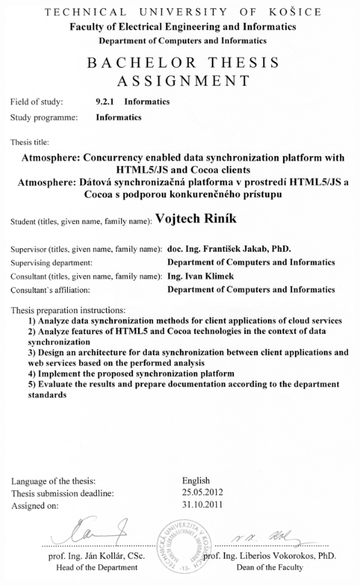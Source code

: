 \documentclass[]{tukethesis}
\begin{document}
\thispagestyle{empty}\bgroup\setlength\tabcolsep{0pt}
\noindent
\begin{centering}
  \includegraphics[width=14cm]{Assign.pdf}
\end{centering}
\newpage

\end{document}

